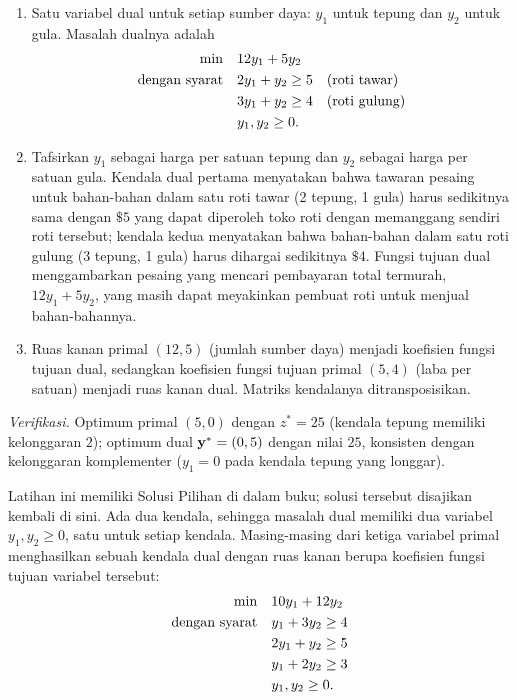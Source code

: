 \begin{enumerate}
\item Satu variabel dual untuk setiap sumber daya: $y_1$ untuk tepung dan $y_2$ untuk gula. Masalah dualnya adalah
\[
\begin{aligned}
\min \quad & 12y_1 + 5y_2 \\
\mbox{dengan syarat}\quad & 2y_1 + y_2 \ge 5 \quad \mbox{(roti tawar)} \\
& 3y_1 + y_2 \ge 4 \quad \mbox{(roti gulung)} \\
& y_1, y_2 \ge 0 .
\end{aligned}
\]
\item Tafsirkan $y_1$ sebagai harga per satuan tepung dan $y_2$ sebagai harga per satuan gula. Kendala dual pertama menyatakan bahwa tawaran pesaing untuk bahan-bahan dalam satu roti tawar (2 tepung, 1 gula) harus sedikitnya sama dengan $\$5$ yang dapat diperoleh toko roti dengan memanggang sendiri roti tersebut; kendala kedua menyatakan bahwa bahan-bahan dalam satu roti gulung (3 tepung, 1 gula) harus dihargai sedikitnya $\$4$. Fungsi tujuan dual menggambarkan pesaing yang mencari pembayaran total termurah, $12y_1 + 5y_2$, yang masih dapat meyakinkan pembuat roti untuk menjual bahan-bahannya.
\item Ruas kanan primal $(12, 5)$ (jumlah sumber daya) menjadi koefisien fungsi tujuan dual, sedangkan koefisien fungsi tujuan primal $(5, 4)$ (laba per satuan) menjadi ruas kanan dual. Matriks kendalanya ditransposisikan.
\end{enumerate}

\emph{Verifikasi.} Optimum primal $(5, 0)$ dengan $z^* = 25$ (kendala tepung memiliki kelonggaran $2$); optimum dual $\mathbf{y}^* = (0, 5)$ dengan nilai $25$, konsisten dengan kelonggaran komplementer ($y_1 = 0$ pada kendala tepung yang longgar).


Latihan ini memiliki Solusi Pilihan di dalam buku; solusi tersebut disajikan kembali di sini. Ada dua kendala, sehingga masalah dual memiliki dua variabel $y_1, y_2 \geq 0$, satu untuk setiap kendala. Masing-masing dari ketiga variabel primal menghasilkan sebuah kendala dual dengan ruas kanan berupa koefisien fungsi tujuan variabel tersebut:
\[
\begin{aligned}
\min \quad & 10y_1 + 12y_2 \\
\mbox{dengan syarat}\quad & y_1 + 3y_2 \ge 4 \\
& 2y_1 + y_2 \ge 5 \\
& y_1 + 2y_2 \ge 3 \\
& y_1, y_2 \ge 0 .
\end{aligned}
\]

